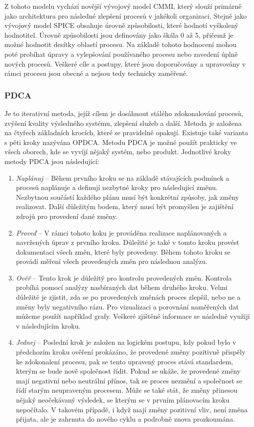 \documentclass[czech,master,public,dept460,male,cpdeclaration,oneside]{diploma}
\begin{document}
Z tohoto modelu vychází novější vývojový model CMMI, který slouží primárně jako architektura pro následné zlepšení procesů v jakékoli organizaci. Stejně jako vývojový model SPICE obsahuje úrovně způsobilosti, které hodnotí vyškolený hodnotitel. Úrovně způsobilosti jsou definovány jako škála 0 až 5, přičemž je možné hodnotit desítky oblastí procesu. Na základě tohoto hodnocení mohou poté probíhat úpravy a vylepšování používaného procesu nebo zavedení úplně nových procesů. Veškeré cíle a postupy, které jsou doporučovány a upravovány v rámci procesu jsou obecné a nejsou tedy technicky zaměřené.

\subsubsection{PDCA}
Je to iterativní metoda, jejíž cílem je dosáhnout stálého zdokonalování procesů, zvýšení kvality výsledného systému, zlepšení služeb a další. Metoda je založena na čtyřech základních krocích, které se pravidelně opakují. Existuje také varianta s pěti kroky nazývána OPDCA. Metodu PDCA je možné použít prakticky ve všech oborech, kde se vyvíjí nějaký systém, nebo produkt.  Jednotlivé kroky metody PDCA jsou následující:

\begin{enumerate}
\item \textit{Naplánuj} -- Během prvního kroku se na základě stávajících podmínek a procesů naplánuje a definují nezbytné kroky pro následující změnu. Nezbytnou součástí každého plánu musí být konkrétní způsoby, jak změny realizovat. Další důležitým bodem, který musí být promyšlen je zajištění zdrojů pro provedení dané změny.
\item \textit{Proveď} -- V rámci tohoto koku je prováděna realizace naplánovaných a navržených úprav z prvního kroku. Důležité je také v tomto kroku provést dokumentaci všech změn, které byly provedeny. Během tohoto kroku se provádí měření všech provedených změn pro následnou analýzu.
\item \textit{Ověř} -- Tento krok je důležitý pro kontrolu provedených změn. Kontrola probíhá pomocí analýzy nasbíraných dat během druhého kroku. Velmi důležité je zjistit, zda se po provedených změnách proces zlepšil, nebo ne a změny byly negativního rázu. Pro vizualizaci a porovnání naměřených dat můžeme použít například grafy. Veškeré zjištěné informace se následně využijí v následujícím kroku.
\item \textit{Jednej} -- Poslední krok je založen na logickém postupu, kdy pokud bylo v předchozím kroku ověření prokázáno, že provedené změny pozitivně přispěly ke zdokonalení procesu, pak se tento upravený proces stává standardem, kterým se bude nově společnost řídit. Pokud se ukáže, že provedené změny mají negativní nebo neutrální přínos, tak se proces nezmění a společnost se řídí starým neupraveným procesem. Může se také stát, že změny přinesou nějaký neočekávaný výsledek, se kterým se v prvním plánovacím kroku nepočítalo. V takovém případě, i když mají změny pozitivní vliv, není změna přijata, ale je zahrnuta do nového cyklu a podrobně znova prozkoumána.
\end{enumerate}
\end{document}
